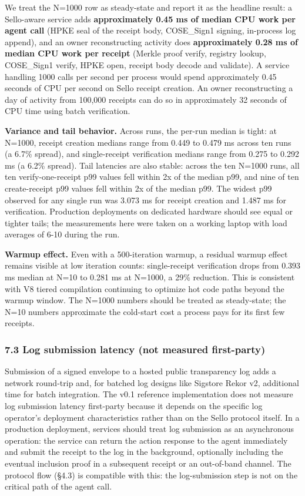 \documentclass[
  11pt,
]{article}
\begin{document}
We treat the N=1000 row as steady-state and report it as the headline
result: a Sello-aware service adds \textbf{approximately 0.45 ms of
median CPU work per agent call} (HPKE seal of the receipt body,
COSE\_Sign1 signing, in-process log append), and an owner reconstructing
activity does \textbf{approximately 0.28 ms of median CPU work per
receipt} (Merkle proof verify, registry lookup, COSE\_Sign1 verify, HPKE
open, receipt body decode and validate). A service handling 1000 calls
per second per process would spend approximately 0.45 seconds of CPU per
second on Sello receipt creation. An owner reconstructing a day of
activity from 100,000 receipts can do so in approximately 32 seconds of
CPU time using batch verification.

\textbf{Variance and tail behavior.} Across runs, the per-run median is
tight: at N=1000, receipt creation medians range from 0.449 to 0.479 ms
across ten runs (a 6.7\% spread), and single-receipt verification
medians range from 0.275 to 0.292 ms (a 6.2\% spread). Tail latencies
are also stable: across the ten N=1000 runs, all ten verify-one-receipt
p99 values fell within 2x of the median p99, and nine of ten
create-receipt p99 values fell within 2x of the median p99. The widest
p99 observed for any single run was 3.073 ms for receipt creation and
1.487 ms for verification. Production deployments on dedicated hardware
should see equal or tighter tails; the measurements here were taken on a
working laptop with load averages of 6-10 during the run.

\textbf{Warmup effect.} Even with a 500-iteration warmup, a residual
warmup effect remains visible at low iteration counts: single-receipt
verification drops from 0.393 ms median at N=10 to 0.281 ms at N=1000, a
29\% reduction. This is consistent with V8 tiered compilation continuing
to optimize hot code paths beyond the warmup window. The N=1000 numbers
should be treated as steady-state; the N=10 numbers approximate the
cold-start cost a process pays for its first few receipts.

\hypertarget{log-submission-latency-not-measured-first-party}{%
\subsubsection{7.3 Log submission latency (not measured
first-party)}\label{log-submission-latency-not-measured-first-party}}

Submission of a signed envelope to a hosted public transparency log adds
a network round-trip and, for batched log designs like Sigstore Rekor
v2, additional time for batch integration. The v0.1 reference
implementation does not measure log submission latency first-party
because it depends on the specific log operator's deployment
characteristics rather than on the Sello protocol itself. In a
production deployment, services should treat log submission as an
asynchronous operation: the service can return the action response to
the agent immediately and submit the receipt to the log in the
background, optionally including the eventual inclusion proof in a
subsequent receipt or an out-of-band channel. The protocol flow (§4.3)
is compatible with this: the log-submission step is not on the critical
path of the agent call.
\end{document}
